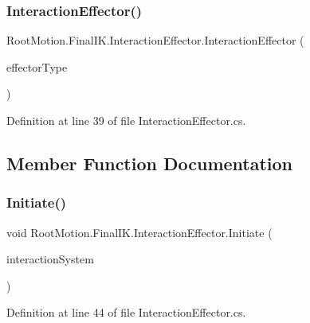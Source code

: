 \subsubsection{\texorpdfstring{Interaction\+Effector()}{InteractionEffector()}}
{\footnotesize\ttfamily Root\+Motion.\+Final\+I\+K.\+Interaction\+Effector.\+Interaction\+Effector (\begin{DoxyParamCaption}\item[{\mbox{\hyperlink{namespace_root_motion_1_1_final_i_k_ae0dd2058c7667b6f132c11a6b860c14a}{Full\+Body\+Biped\+Effector}}}]{effector\+Type }\end{DoxyParamCaption})}



Definition at line 39 of file Interaction\+Effector.\+cs.



\subsection{Member Function Documentation}
\mbox{\label{class_root_motion_1_1_final_i_k_1_1_interaction_effector_ade0431085297e409476a5319837df14d}} 
\subsubsection{\texorpdfstring{Initiate()}{Initiate()}}
{\footnotesize\ttfamily void Root\+Motion.\+Final\+I\+K.\+Interaction\+Effector.\+Initiate (\begin{DoxyParamCaption}\item[{\mbox{\hyperlink{class_root_motion_1_1_final_i_k_1_1_interaction_system}{Interaction\+System}}}]{interaction\+System }\end{DoxyParamCaption})}



Definition at line 44 of file Interaction\+Effector.\+cs.

\mbox{\label{class_root_motion_1_1_final_i_k_1_1_interaction_effector_a5b5222ee077d98311c7193d34fe420d4}} 
